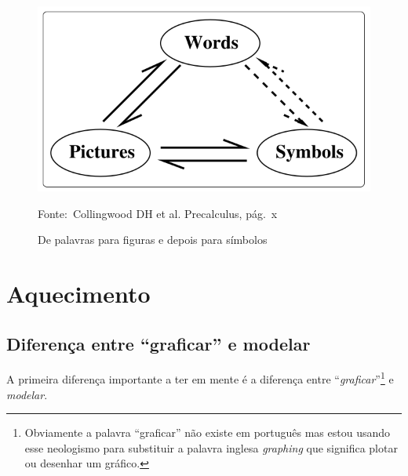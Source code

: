 \documentclass[pdftex, brazil, 12pt, twoside]{article}
\begin{document}
\begin{figure}[ht]
  \begin{center}
    \caption{De palavras para figuras e depois para símbolos}
    \label{fig:palavras-imagens-simbolos}
    \includegraphics[scale=0.5]{imagens/palavras-imagens-simbolos.png}
    
    \footnotesize{Fonte:~Collingwood DH et al. Precalculus, pág.\ x}
  \end{center}
\end{figure}


\section{Aquecimento}
\label{aquecimento}

\subsection{Diferença entre ``graficar'' e modelar}
\label{aquecimento-graficar-modelar}

A primeira diferença importante a ter em mente é a diferença entre ``\emph{graficar}''\footnote{Obviamente
  a palavra ``graficar'' não existe em português mas estou usando esse neologismo para substituir
  a palavra inglesa \emph{graphing} que significa plotar ou desenhar um gráfico.} e \emph{modelar}.
\end{document}
